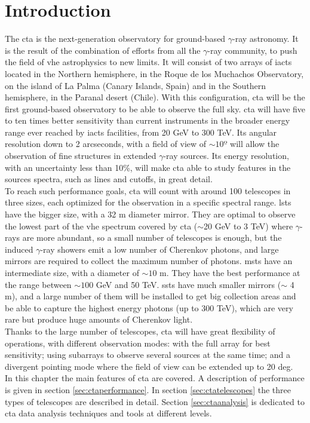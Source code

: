 \documentclass[main.tex]{subfiles}
\begin{document}
\glsresetall

\section{Introduction}

The \gls{cta} \cite{CTA} is the next-generation observatory for ground-based  $\gamma$-ray astronomy. It is the result of the combination of efforts from all the $\gamma$-ray community, to push the field of \gls{vhe} astrophysics to new limits. It will consist of two arrays of \glspl{iact} located in the Northern hemisphere, in the Roque de los Muchachos Observatory, on the island of La Palma (Canary Islands, Spain) and in the Southern hemisphere, in the Paranal desert (Chile). With this configuration, \gls{cta} will be the first ground-based observatory to be able to observe the full sky. \gls{cta} will have five to ten times better sensitivity than current instruments in the broader energy range ever reached by \glspl{iact} facilities, from 20 GeV to 300 TeV. Its angular resolution down to 2 arcseconds, with a field of view of $\sim 10º$ will allow the observation of fine structures in extended $\gamma$-ray sources. Its energy resolution, with an uncertainty less than 10\%, will make \gls{cta} able to study features in the sources spectra, such as lines and cutoffs, in great detail.\\
To reach such performance goals, \gls{cta} will count with around 100 telescopes in three sizes, each optimized for the observation in a specific spectral range. \glspl{lst} have the bigger size, with a 32 m diameter mirror. They are optimal to observe the lowest part of the \gls{vhe} spectrum covered by \gls{cta} ($\sim$20 GeV to 3 TeV) where $\gamma$-rays are more abundant, so a small number of telescopes is enough, but the induced $\gamma$-ray showers emit a low number of Cherenkov photons, and large mirrors are required to collect the maximum number of photons. \glspl{mst} have an intermediate size, with a diameter of $\sim 10$ m. They have the best performance at the range between $\sim 100$ GeV and 50 TeV. \glspl{sst} have much smaller mirrors ($\sim$ 4 m), and a large number of them will be installed to get big collection areas and be able to capture the highest energy photons (up to 300 TeV), which are very rare but produce huge amounts of Cherenkov light.\\
Thanks to the large number of telescopes, \gls{cta} will have great flexibility of operations, with different observation modes: with the full array for best sensitivity; using subarrays to observe several sources at the same time; and a divergent pointing mode where the field of view can be extended up to 20 deg.\\
In this chapter the main features of \gls{cta} are covered. A description of performance is given in section \ref{sec:ctaperformance}. In section \ref{sec:ctatelescopes} the three types of telescopes are described in detail. Section \ref{sec:ctaanalysis} is dedicated to \gls{cta} data analysis techniques and tools at different levels.
\end{document}
